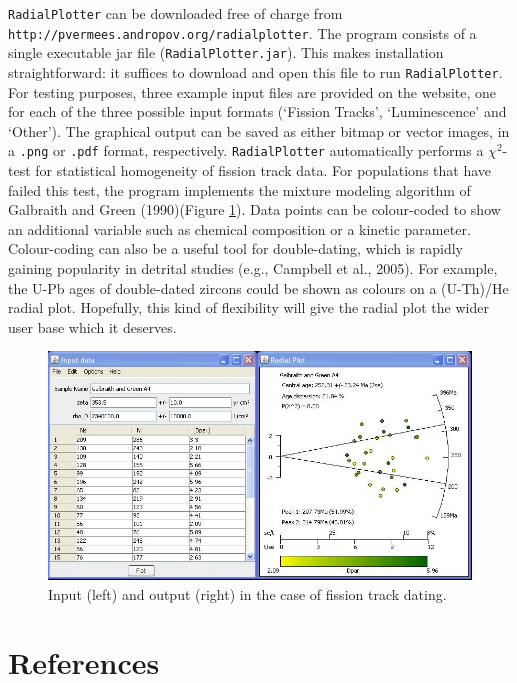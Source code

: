 \documentclass{article}
\begin{document}
{\tt RadialPlotter} can be downloaded free of charge from {\tt
http://pver\-mees.andro\-pov.org/radial\-plotter}.  The program
consists of a single executable jar file ({\tt Radial\-Plotter.jar}).
This makes installation straightforward: it suffices to download and
open this file to run {\tt RadialPlotter}.  For testing purposes,
three example input files are provided on the website, one for each of
the three possible input formats (`Fission Tracks', `Luminescence' and
`Other').  The graphical output can be saved as either bitmap or
vector images, in a {\tt .png} or {\tt .pdf} format,
respectively. {\tt RadialPlotter} automatically performs a
$\chi^2$-test for statistical homogeneity of fission track data.  For
populations that have failed this test, the program implements the
mixture modeling algorithm of Galbraith and Green (1990)(Figure
\ref{fig:input-output}).  Data points can be colour-coded to show an
additional variable such as chemical composition or a kinetic
parameter. Colour-coding can also be a useful tool for double-dating,
which is rapidly gaining popularity in detrital studies (e.g.,
Campbell et al., 2005).  For example, the U-Pb ages of double-dated
zircons could be shown as colours on a (U-Th)/He radial plot.
Hopefully, this kind of flexibility will give the radial plot the
wider user base which it deserves. \\

\begin{figure}
\includegraphics[width = \textwidth]{fig1.jpg}
\caption{Input (left) and output (right)  in the case of fission track
  dating.}
\label{fig:input-output}
\end{figure}

\section*{References}
\end{document}
